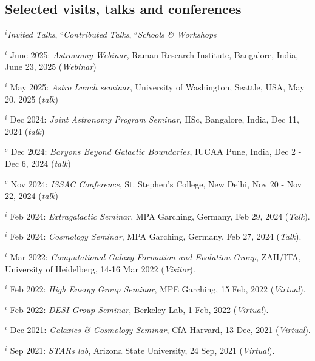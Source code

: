 \documentclass[12pt,letterpaper]{article}
\begin{document}
\subsection{Selected visits, talks and conferences}
\vspace{-1mm}
$^i$\emph{Invited Talks}, $^c$\emph{Contributed Talks}, $^s$\emph{Schools \& Workshops}
\begin{list}{}{\cvlist}
\item $^i$ June 2025:  \emph{Astronomy Webinar}, Raman Research Institute, Bangalore, India, June 23, 2025 (\textit{Webinar})
\item $^i$ May 2025:  \emph{Astro Lunch seminar}, University of Washington, Seattle, USA, May 20, 2025 (\textit{talk})
\item $^i$ Dec 2024:  \emph{Joint Astronomy Program Seminar}, IISc, Bangalore, India, Dec 11, 2024 (\textit{talk})
\item $^c$ Dec 2024:  \emph{Baryons Beyond Galactic Boundaries}, IUCAA Pune, India, Dec 2 - Dec 6, 2024 (\textit{talk})
\item $^c$ Nov 2024:  \emph{ISSAC Conference}, St. Stephen's College, New Delhi, Nov 20 - Nov 22, 2024 (\textit{talk})
\item $^i$ Feb 2024:  \emph{Extragalactic Seminar}, MPA Garching, Germany, Feb 29, 2024 (\textit{Talk}).
\item $^i$ Feb 2024:  \emph{Cosmology Seminar}, MPA Garching, Germany, Feb 27, 2024 (\textit{Talk}).
\item $^i$ Mar 2022:  \emph{\href{https://zah.uni-heidelberg.de/research-groups\#c2659}{Computational Galaxy Formation and Evolution Group}}, ZAH/ITA, University of Heidelberg, 14-16 Mar 2022 (\textit{Visitor}).
\item $^i$ Feb 2022:  \emph{High Energy Group Seminar}, MPE Garching, 15 Feb, 2022 (\textit{Virtual}).
\item $^i$ Feb 2022:  \emph{DESI Group Seminar}, Berkeley Lab, 1 Feb, 2022 (\textit{Virtual}).
\item $^i$ Dec 2021:  \emph{\href{https://pweb.cfa.harvard.edu/calendar/event/9298}{Galaxies \& Cosmology Seminar}}, CfA Harvard, 13 Dec, 2021 (\textit{Virtual}).
\item $^i$ Sep 2021:  \textit{STARs lab}, Arizona State University, 24 Sep, 2021 (\textit{Virtual}).
\end{list}
\vspace{-1.5mm}
\end{document}

